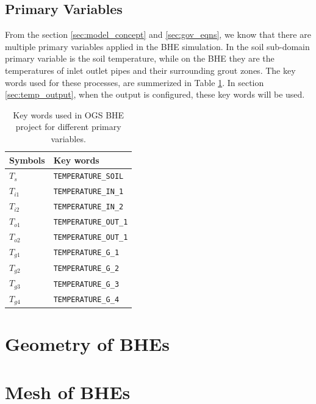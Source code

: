 \subsection{Primary Variables}

From the section \ref{sec:model_concept} and \ref{sec:gov_eqns}, we know that there are multiple primary variables applied in the BHE simulation. In the soil sub-domain primary variable is the soil temperature, while on the BHE they are the temperatures of inlet outlet pipes and their surrounding grout zones. The key words used for these processes, are summerized in Table \ref{tab:pvar_keywords}. In section \ref{sec:temp_output}, when the output is configured, these key words will be used. 

\begin{table}
\caption{Key words used in OGS BHE project for different primary variables. }
\label{tab:pvar_keywords}
\centering
\begin{tabular}{l l }
\hline
Symbols    & Key words  \\
\hline
$T_s$             & \texttt{TEMPERATURE\_SOIL} \\
$T_{i1}$          & \texttt{TEMPERATURE\_IN\_1} \\
$T_{i2}$          & \texttt{TEMPERATURE\_IN\_2} \\
$T_{o1}$          & \texttt{TEMPERATURE\_OUT\_1} \\
$T_{o2}$          & \texttt{TEMPERATURE\_OUT\_1} \\
$T_{g1}$          & \texttt{TEMPERATURE\_G\_1} \\
$T_{g2}$          & \texttt{TEMPERATURE\_G\_2} \\
$T_{g3}$          & \texttt{TEMPERATURE\_G\_3} \\
$T_{g4}$          & \texttt{TEMPERATURE\_G\_4} \\
\hline
\end{tabular}
\end{table}



\section{Geometry of BHEs}



\section{Mesh of BHEs}



